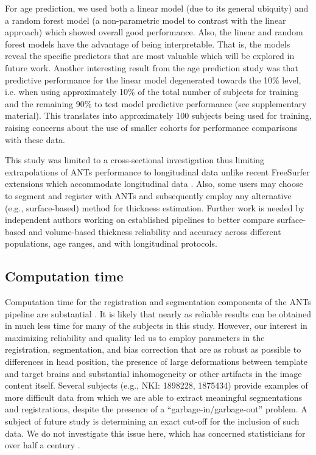 For age prediction,
we used both a linear model (due to its general ubiquity) and a random
forest model (a non-parametric model to contrast with the linear approach)
which showed overall good performance.  Also, the linear  and
random forest models have the advantage of being
interpretable.  That is, the models reveal the specific predictors
that are most valuable which will be explored in future work.  
Another interesting result from the age prediction study was that 
predictive performance for the linear model degenerated towards the 10\% level, i.e. 
when using approximately 10\% of the total number of subjects for 
training and the remaining 90\% to test model predictive performance 
(see supplementary material).
This translates into approximately 100 subjects being used for training,
raising concerns about the use of smaller cohorts for performance comparisons
with these data.

This study was limited to a cross-sectional investigation thus limiting
extrapolations of ANTs performance to longitudinal data unlike
recent FreeSurfer extensions which accommodate longitudinal data \citep{reuter2012,jovicich2013}.  
Also, some users may choose to segment and register
with ANTs and subsequently employ any alternative (e.g., surface-based)
method for thickness estimation.  Further work is needed by
independent authors working on established pipelines 
to better compare surface-based and volume-based thickness reliability
and accuracy across different populations, age ranges, and with 
longitudinal protocols. 

\subsection{Computation time}
Computation time for the registration and segmentation components of
the ANTs pipeline are substantial {\color{blue}{but are not significantly worse than
FreeSurfer}}.  It is likely that nearly as reliable
results can be obtained in much less time for many of the subjects in
this study.  However, our interest in
maximizing reliability and quality led us to employ parameters in the
registration, segmentation, and bias correction that are as robust as
possible to differences in head position, the presence of large
deformations between template and target brains and substantial
inhomogeneity or other artifacts in the image content itself.  Several
subjects (e.g., NKI: 1898228, 1875434) provide examples of more difficult
data from which we are able to
extract meaningful segmentations and registrations, despite the presence of a
``garbage-in/garbage-out'' problem.  A subject of future study is
determining an exact cut-off for the inclusion of such data.  We do not
investigate this issue here, which has concerned statisticians for over
half a century \citep{Hampel2001}. 

